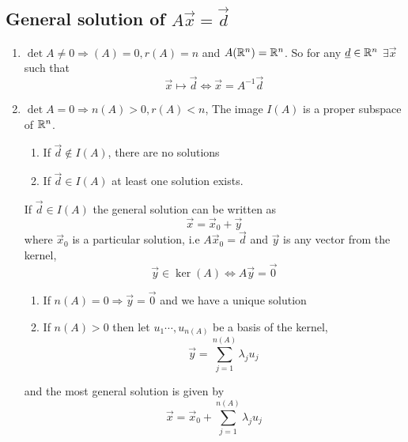 \documentclass{article}
\numberwithin{equation}{section}
\begin{document}
\subsection{General solution of $A\vec x = \vec d$}
\begin{enumerate}
    \item $\det A \neq 0 \Rightarrow (A) = 0, r(A) = n$ and $A(\mathbb{R}^n) = \mathbb{R}^n$.
    So for any $\underline{d} \in \mathbb{R}^n$ $\exists \vec x$ such that
    \[
        \vec x \mapsto \vec d \Leftrightarrow \vec x = A^{-1} \vec d 
    \]
    
    \item $\det A = 0 \Rightarrow n(A) > 0, r(A) < n$, The image $I(A)$ is a proper subspace of $\mathbb{R}^n$.
    \begin{enumerate}
        \item If $\vec d \notin I(A)$, there are no solutions
        \item If $\vec d \in I(A)$ at least one solution exists.
    \end{enumerate}

    If $\vec d \in I(A)$ the general solution can be written as
    \[
        \vec x = \vec x_0 + \vec y  
    \]
    where $\vec x_0$ is a particular solution, i.e $A \vec x_0 = \vec d$ and $\vec y$ is any vector from the kernel,
    \[
        \vec y \in \ker (A) \Leftrightarrow A \vec y = \vec 0  
    \]
    \begin{enumerate}
        \item If $n(A) = 0 \Rightarrow \vec y = \vec 0$ and we have a unique solution
        \item If $n(A) > 0$ then let $u_1 \cdots, u_{n(A)}$ be a basis of the kernel,
        \[
            \vec y = \sum_{j=1}^{n(A)} \lambda_j u_j  
        \]
    \end{enumerate}
    and the most general solution is given by
    \[
        \vec x = \vec x_0 + \sum_{j=1}^{n(A)} \lambda_j u_j
    \]
\end{enumerate}
\end{document}
